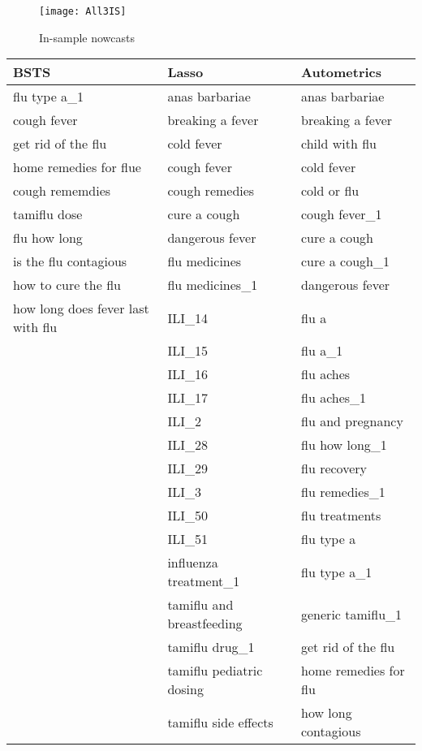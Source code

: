 \begin{figure}[h]
\centering
\texttt{[image: All3IS]}
\caption{In-sample nowcasts}
\label{ig:InSample}
\end{figure}

\begin{table}
\small
\singlespacing
  \centering

    \begin{tabular}{l  | l  | l}
    \textbf{BSTS} & \textbf{Lasso} & \textbf{Autometrics} \\
    \hline
    flu type a_1 & anas barbariae & anas barbariae \\
    cough fever& breaking a fever & breaking a fever \\
    get rid of the flu& cold fever & child with flu \\
   home remedies for flue & cough fever & cold fever \\
  cough rememdies  & cough remedies & cold or flu \\
   tamiflu dose & cure a cough & cough fever_1 \\
   flu how long & dangerous fever & cure a cough \\
    is the flu contagious& flu medicines & cure a cough_1 \\
    how to cure the flu& flu medicines_1 & dangerous fever \\
   how long does fever last with flu  & ILI_14 & flu a \\
	 & ILI_15 & flu a_1 \\
    & ILI_16 & flu aches \\
    & ILI_17 & flu aches_1 \\
     & ILI_2 & flu and pregnancy \\
     & ILI_28 & flu how long_1 \\
   & ILI_29 & flu recovery \\
    & ILI_3 & flu remedies_1 \\
     & ILI_50 & flu treatments \\
    & ILI_51 & flu type a \\
     & influenza treatment_1 & flu type a_1 \\
    & tamiflu and breastfeeding & generic tamiflu_1 \\
    & tamiflu drug_1 & get rid of the flu \\
    & tamiflu pediatric dosing & home remedies for flu \\
     & tamiflu side effects & how long contagious \\

\end{tabular}
\end{table}
